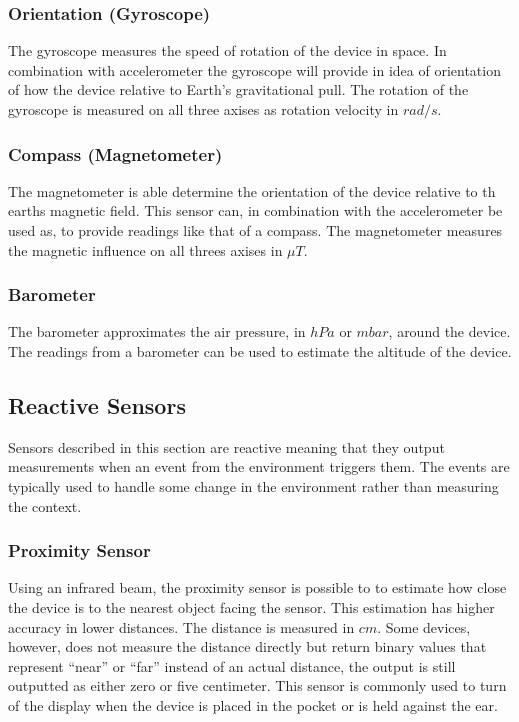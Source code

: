 \subsubsection{Orientation (Gyroscope)}
The gyroscope measures the speed of rotation of the device in space. In combination with accelerometer the gyroscope will provide in idea of orientation of how the device relative to Earth's gravitational pull. The rotation of the gyroscope is measured on all three axises as rotation velocity in $rad/s$.

\subsubsection{Compass (Magnetometer)}
The magnetometer is able determine the orientation of the device relative to th earths magnetic field. This sensor can, in combination with the accelerometer be used as, to provide readings like that of a compass. The magnetometer measures the magnetic influence on all threes axises in $\mu T$.

\subsubsection{Barometer}
The barometer approximates the air pressure, in $hPa$ or $mbar$, around the device. The readings from a barometer can be used to estimate the altitude of the device. 

\subsection{Reactive Sensors}
Sensors described in this section are reactive meaning that they output measurements when an event from the environment triggers them. The events are typically used to handle some change in the environment rather than measuring the context.

\subsubsection{Proximity Sensor}
Using an infrared beam, the proximity sensor is possible to to estimate how close the device is to the nearest object facing the sensor. This estimation has higher accuracy in lower distances. The distance is measured in $cm$. Some devices, however, does not measure the distance directly but return binary values that represent ``near'' or ``far'' instead of an actual distance, the output is still outputted as either zero or five centimeter. This sensor is commonly used to turn of the display when the device is placed in the pocket or is held against the ear.

